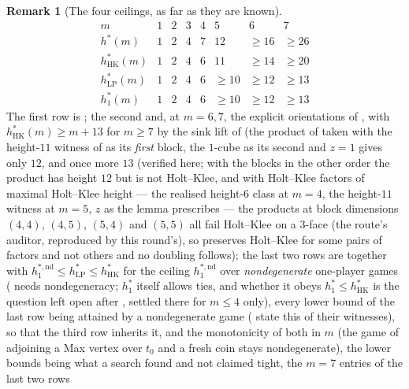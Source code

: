\documentclass[11pt]{article}
\theoremstyle{plain}
\theoremstyle{definition}
\newtheorem{remark}[theorem]{Remark}
\begin{document}
\begin{remark}[The four ceilings, as far as they are known]\label{rem:four-ceilings}
\[
\begin{array}{l|ccccccc}
m & 1 & 2 & 3 & 4 & 5 & 6 & 7\\ \hline
h^{\ast}(m) & 1 & 2 & 4 & 7 & 12 & \ge16 & \ge26\\
h^{\ast}_{\mathrm{HK}}(m) & 1 & 2 & 4 & 6 & 11 & \ge14 & \ge20\\
h^{\ast}_{\mathrm{LP}}(m) & 1 & 2 & 4 & 6 & \ge10 & \ge12 & \ge13\\
h^{\ast}_{1}(m) & 1 & 2 & 4 & 6 & \ge10 & \ge12 & \ge13
\end{array}
\]
The first row is ; the
second  and, at $m=6,7$, the explicit
orientations of , with $h^{\ast}_{\mathrm{HK}}(m)\ge m+13$
for $m\ge7$ by the sink lift of  (the product of
 taken with the height-$11$ witness of
 as its \emph{first} block, the $1$-cube as its second
and $z=1$ gives only $12$, and once more $13$
(verified here; with the blocks in the other order the product has height
$12$ but is not Holt--Klee, and with Holt--Klee factors of maximal
Holt--Klee height --- the realised height-$6$ class at $m=4$, the
height-$11$ witness at $m=5$, $z$ as the lemma prescribes --- the
products at block dimensions $(4,4)$, $(4,5)$, $(5,4)$ and $(5,5)$ all
fail Holt--Klee on a $3$-face (the route's auditor, reproduced by this
round's), so  preserves Holt--Klee for some pairs
of factors and not others and no doubling follows); the last two rows are
 together with
$h^{\ast,\mathrm{nd}}_{1}\le h^{\ast}_{\mathrm{LP}}\le h^{\ast}_{\mathrm{HK}}$
for the ceiling $h^{\ast,\mathrm{nd}}_{1}$ over \emph{nondegenerate}
one-player games ( needs nondegeneracy;
$h^{\ast}_{1}$ itself allows ties, and whether it obeys
$h^{\ast}_{1}\le h^{\ast}_{\mathrm{HK}}$ is the question left open after
, settled there for $m\le4$ only), every lower bound
of the last row being attained by a nondegenerate game
(
state this of their witnesses), so that the third row inherits it, and
the monotonicity of both in $m$ (the game
of  adjoining a Max vertex over $t_0$ and a
fresh coin stays nondegenerate), the lower bounds being what a search
found and not claimed tight, the $m=7$ entries of the last two rows

\end{remark}
\end{document}
